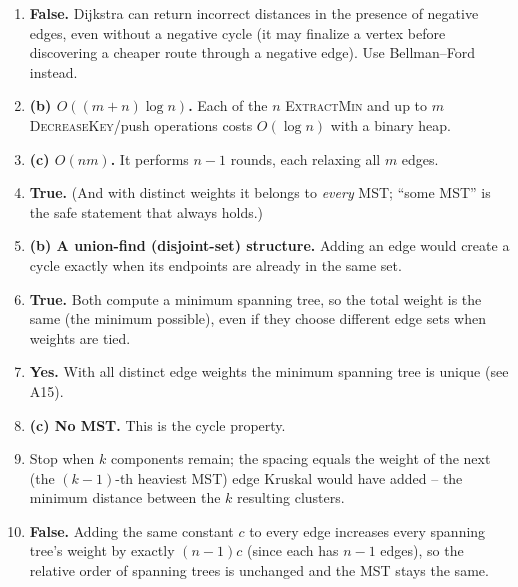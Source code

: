 \documentclass[11pt]{article}
\begin{document}
\begin{enumerate}[label=\textbf{B\arabic*.}, leftmargin=2.2em]

\item \textbf{False.} Dijkstra can return incorrect distances in the presence of
negative edges, even without a negative cycle (it may finalize a vertex before
discovering a cheaper route through a negative edge). Use Bellman--Ford instead.

\item \textbf{(b) $O((m+n)\log n)$.} Each of the $n$ \textsc{ExtractMin} and up
to $m$ \textsc{DecreaseKey}/push operations costs $O(\log n)$ with a binary heap.

\item \textbf{(c) $O(nm)$.} It performs $n-1$ rounds, each relaxing all $m$
edges.

\item \textbf{True.} (And with distinct weights it belongs to \emph{every} MST;
``some MST'' is the safe statement that always holds.)

\item \textbf{(b) A union-find (disjoint-set) structure.} Adding an edge would
create a cycle exactly when its endpoints are already in the same set.

\item \textbf{True.} Both compute a minimum spanning tree, so the total weight is
the same (the minimum possible), even if they choose different edge sets when
weights are tied.

\item \textbf{Yes.} With all distinct edge weights the minimum spanning tree is
unique (see A15).

\item \textbf{(c) No MST.} This is the cycle property.

\item Stop when \textbf{$k$} components remain; the spacing equals the weight of
the next (the $(k-1)$-th heaviest MST) edge Kruskal would have added -- the
minimum distance between the $k$ resulting clusters.

\item \textbf{False.} Adding the same constant $c$ to every edge increases every
spanning tree's weight by exactly $(n-1)c$ (since each has $n-1$ edges), so the
relative order of spanning trees is unchanged and the MST stays the same.

\end{enumerate}
\end{document}

